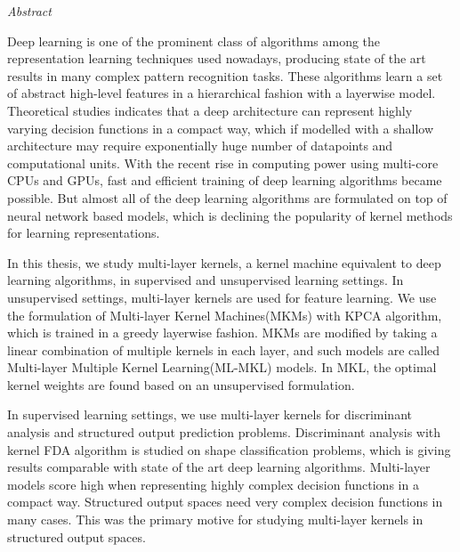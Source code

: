\documentclass[a4paper, 12pt, oneside]{Thesis}  %
\begin{document}
\begin{center}
\LARGE\textit{Abstract}
\end{center}
\vspace{10 mm}
\begin{spacing}{1.5}
Deep learning is one of the prominent class of algorithms among the representation learning techniques used nowadays, producing state of the art results in many complex pattern recognition tasks. These algorithms learn a set of abstract high-level features in a hierarchical fashion with a layerwise model. Theoretical studies indicates that a deep architecture can represent highly varying decision functions in a compact way, which if modelled with a shallow architecture may require exponentially huge number of datapoints and computational units. With the recent rise in computing power using multi-core CPUs and GPUs, fast and efficient training of deep learning algorithms became possible. But almost all of the deep learning algorithms are formulated on top of neural network based models, which is declining the popularity of kernel methods for learning representations.


In this thesis, we study multi-layer kernels, a kernel machine equivalent to deep learning algorithms, in supervised and unsupervised learning settings. In unsupervised settings, multi-layer kernels are used for feature learning. We use the formulation of Multi-layer Kernel Machines(MKMs) with KPCA algorithm, which is trained in a greedy layerwise fashion. MKMs are modified by taking a linear combination of multiple kernels in each layer, and such models are called Multi-layer Multiple Kernel Learning(ML-MKL) models. In MKL, the optimal kernel weights are found based on an unsupervised formulation.

In supervised learning settings, we use multi-layer kernels for discriminant analysis and structured output prediction problems. Discriminant analysis with kernel FDA algorithm is studied on shape classification problems, which is giving results comparable with state of the art deep learning algorithms. Multi-layer models score high when representing highly complex decision functions in a compact way. Structured output spaces need very complex decision functions in many cases. This was the primary motive for studying multi-layer kernels in structured output spaces.
\end{spacing}

\clearpage  %
\end{document}
